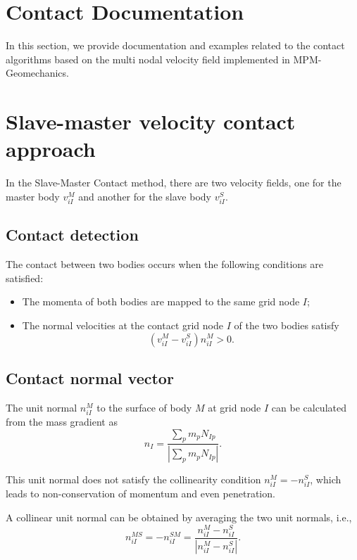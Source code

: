 \section{Contact Documentation}
In this section, we provide documentation and examples related to the contact algorithms based on the multi nodal velocity field implemented in MPM-Geomechanics.

\section{Slave-master velocity contact approach}

In the Slave-Master Contact method, there are two velocity fields, one for the master body $v_{iI}^{M}$ and another for the slave body $v_{iI}^{S}$.

\subsection {Contact detection}

The contact between two bodies occurs when the following conditions are satisfied:

\begin{itemize}
    \item The momenta of both bodies are mapped to the same grid node $I$;
    \item The normal velocities at the contact grid node $I$ of the two bodies satisfy
    \begin{equation}
        \left( v^{M}_{iI} - v^{S}_{iI} \right)n^{M}_{iI} > 0.
    \end{equation}
\end{itemize}

\subsection {Contact normal vector}

The unit normal $n^{M}_{iI}$ to the surface of body $M$ at grid node $I$ can be calculated from the mass gradient as
\begin{equation}
    n_I = \frac{\sum_p m_p N_{Ip}}{\left| \sum_p m_p N_{Ip} \right|}.
\end{equation}

This unit normal does not satisfy the collinearity condition $n^{M}_{iI} = -n^{S}_{iI}$, which leads to non-conservation of momentum and even penetration.

A collinear unit normal can be obtained by averaging the two unit normals, i.e.,
\begin{equation}
    n^{MS}_{iI} = -n^{SM}_{iI} = \frac{n^{M}_{iI}-n^{S}_{iI}}{|n^{M}_{iI}-n^{S}_{iI}|}.
\end{equation}

